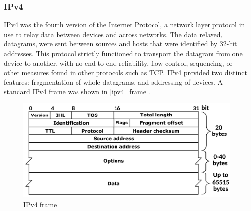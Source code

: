 \subsubsection{IPv4} 
IPv4 was the fourth version of the Internet Protocol, a network layer protocol in use to relay data between devices and across networks. The data relayed, datagrams, were sent between sources and hosts that were identified by 32-bit addresses. This protocol strictly functioned to transport the datagram from one device to another, with no end-to-end reliability, flow control, sequencing, or other measures found in other protocols such as TCP. IPv4 provided two distinct features: fragmentation of whole datagrams, and addressing of devices. A standard IPv4 frame was shown in \autoref{ipv4_frame}.
\begin{figure}[H]
    \caption{IPv4 frame \cite{Postel1981}}
    \label{ipv4_frame}
    \centering
    \includegraphics[width=\textwidth]{images/ipv4_frame.png}
\end{figure}

